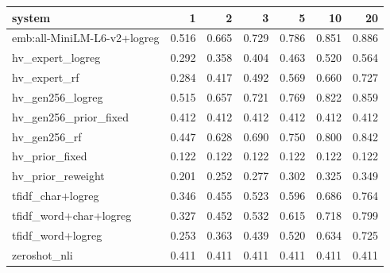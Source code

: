 \begin{tabular}{lrrrrrr}
\toprule
system & 1 & 2 & 3 & 5 & 10 & 20 \\
\midrule
emb:all-MiniLM-L6-v2+logreg & 0.516 & 0.665 & 0.729 & 0.786 & 0.851 & 0.886 \\
hv\_expert\_logreg & 0.292 & 0.358 & 0.404 & 0.463 & 0.520 & 0.564 \\
hv\_expert\_rf & 0.284 & 0.417 & 0.492 & 0.569 & 0.660 & 0.727 \\
hv\_gen256\_logreg & 0.515 & 0.657 & 0.721 & 0.769 & 0.822 & 0.859 \\
hv\_gen256\_prior\_fixed & 0.412 & 0.412 & 0.412 & 0.412 & 0.412 & 0.412 \\
hv\_gen256\_rf & 0.447 & 0.628 & 0.690 & 0.750 & 0.800 & 0.842 \\
hv\_prior\_fixed & 0.122 & 0.122 & 0.122 & 0.122 & 0.122 & 0.122 \\
hv\_prior\_reweight & 0.201 & 0.252 & 0.277 & 0.302 & 0.325 & 0.349 \\
tfidf\_char+logreg & 0.346 & 0.455 & 0.523 & 0.596 & 0.686 & 0.764 \\
tfidf\_word+char+logreg & 0.327 & 0.452 & 0.532 & 0.615 & 0.718 & 0.799 \\
tfidf\_word+logreg & 0.253 & 0.363 & 0.439 & 0.520 & 0.634 & 0.725 \\
zeroshot\_nli & 0.411 & 0.411 & 0.411 & 0.411 & 0.411 & 0.411 \\
\bottomrule
\end{tabular}
